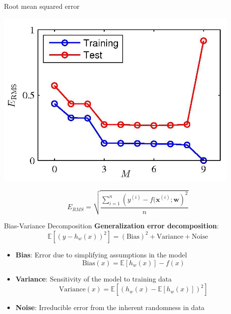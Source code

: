 \documentclass[serif, aspectratio=169]{beamer}
\begin{document}
\begin{frame}{Root mean squared error}
    \begin{minipage}{0.45\textwidth}
        \centering 
        \includegraphics[width=0.9\textwidth]{pic/Polynomial_regression/erms_polynomial_regression.png}
    \end{minipage}%
    \begin{minipage}{0.45\textwidth}
        \[ 
        E_{RMS} = \sqrt{\dfrac{\sum_{i=1}^n \left( y^{(i)} - f(\mathbf{x}^{(i)}; \mathbf{w} \right)^2}{n}}
        \]
    \end{minipage}
    \vfill
\end{frame}

\begin{frame}{Bias-Variance Decomposition}
    \textbf{Generalization error decomposition}:
    \[
    \mathbb{E}[(y - h_w(x))^2] = (\text{Bias})^2 + \text{Variance} + \text{Noise}
    \]
    \begin{itemize}
        \item \textbf{Bias}: Error due to simplifying assumptions in the model
        \[
        \text{Bias}(x) = \mathbb{E}[h_w(x)] - f(x)
        \]
        \item \textbf{Variance}: Sensitivity of the model to training data
        \[
        \text{Variance}(x) = \mathbb{E}[(h_w(x) - \mathbb{E}[h_w(x)])^2]
        \]
        \item \textbf{Noise}: Irreducible error from the inherent randomness in data
    \end{itemize}
\end{frame}
\end{document}
